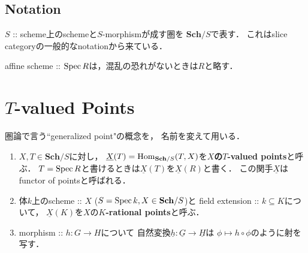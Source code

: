 \documentclass[a4paper]{jsarticle}
\newcommand{\Sch}{\mathbf{Sch}}
\newcommand{\func}[1]{\underline{#1}}
\begin{document}
\subsection*{Notation}
    $S$ :: scheme上のschemeと$S$-morphismが成す圏を
    \textbf{$\Sch/S$}で表す．
    これはslice categoryの一般的なnotationから来ている．
    
    affine scheme :: $\operatorname{Spec} R$は，混乱の恐れがないときは$R$と略す．

\section{\texorpdfstring{$T$}{T}-valued Points}
    圏論で言う``generalized point"の概念を，
    名前を変えて用いる．

    \begin{Def}
    \enumfix
    \begin{enumerate}[label=(\roman*),leftmargin=*]
    \item 
    $X, T \in \Sch/S$に対し，
    $\func{X}(T)=\Hom_{\Sch/S}(T,X)$を\textbf{$X$の$T$-valued points}と呼ぶ．
    $T=\operatorname{Spec} R$と書けるときは$\func{X}(T)$を$\func{X}(R)$と書く．
    この関手$\func{X}$はfunctor of pointsと呼ばれる．

    \item
    体$k$上のscheme :: $X$ ($S=\Spec k, X \in \Sch/S$)と
    field extension :: $k \subseteq K$について，
    $\func{X}(K)$を$X$の\textbf{$K$-rational points}と呼ぶ．

    \item
    morphism :: $h: G \to H$について
    自然変換$\func{h}: \func{G} \to \func{H}$は
    $\phi \mapsto h \circ \phi$のように射を写す．
    \end{enumerate}
    \end{Def}
\end{document}
